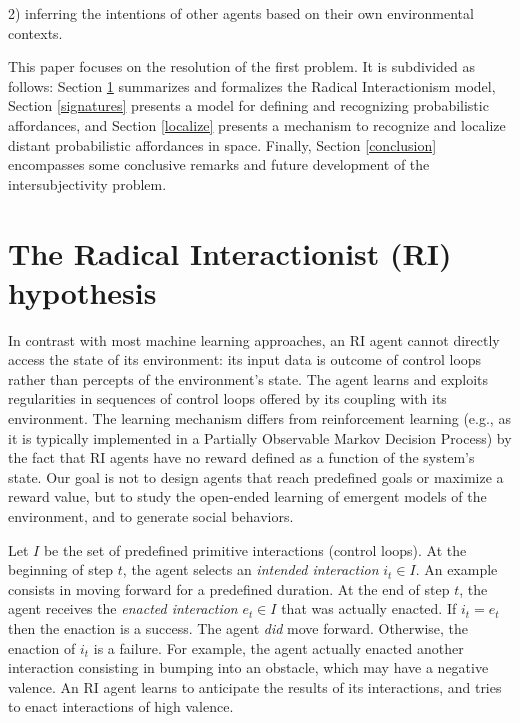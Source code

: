 \documentclass[conference]{IEEEtran}
\begin{document}
2) inferring the intentions of other agents based on their own environmental contexts.

This paper focuses on the resolution of the first problem. 
It is subdivided as follows: Section \ref{RI} summarizes and formalizes the Radical Interactionism model, Section \ref{signatures} presents a model for defining and recognizing probabilistic affordances, and Section \ref{localize} presents a mechanism to recognize and localize distant probabilistic affordances in space. Finally, Section \ref{conclusion} encompasses some conclusive remarks and future development of the intersubjectivity problem.




\section{The Radical Interactionist (RI) hypothesis}\label{RI}

In contrast with most machine learning approaches, an RI agent cannot directly access the state of its environment: its input data is outcome of control loops rather than percepts of the environment's state.
The agent learns and exploits regularities in sequences of control loops offered by its coupling with its environment.
The learning mechanism differs from reinforcement learning (e.g., as it is typically implemented in a Partially Observable Markov Decision Process) by the fact that RI agents have no reward defined as a function of the system's state.
Our goal is not to design agents that reach predefined goals or maximize a reward value, but to study the open-ended learning of emergent models of the environment, and to generate social behaviors.

Let $I$ be the set of predefined primitive interactions (control loops).
At the beginning of step $t$, the agent selects an \textit{intended interaction} $i_t \in I$.
An example consists in moving forward for a predefined duration.
At the end of step $t$, the agent receives the \textit{enacted interaction} $e_t \in I$ that was actually enacted. 
If $i_t = e_t$ then the enaction is a success. 
The agent \textit{did} move forward.
Otherwise, the enaction of $i_t$ is a failure.
For example, the agent actually enacted another interaction consisting in bumping into an obstacle, which may have a negative valence.
An RI agent learns to anticipate the results of its interactions, and tries to enact interactions of high valence.
\end{document}
